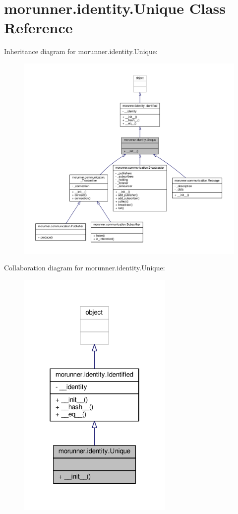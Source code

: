 \hypertarget{classmorunner_1_1identity_1_1Unique}{}\section{morunner.\+identity.\+Unique Class Reference}
\label{classmorunner_1_1identity_1_1Unique}


Inheritance diagram for morunner.\+identity.\+Unique\+:
\nopagebreak
\begin{figure}[H]
\begin{center}
\leavevmode
\includegraphics[width=350pt]{classmorunner_1_1identity_1_1Unique__inherit__graph}
\end{center}
\end{figure}


Collaboration diagram for morunner.\+identity.\+Unique\+:
\nopagebreak
\begin{figure}[H]
\begin{center}
\leavevmode
\includegraphics[width=214pt]{classmorunner_1_1identity_1_1Unique__coll__graph}
\end{center}
\end{figure}
